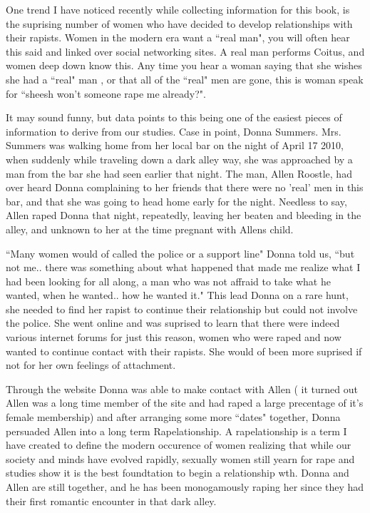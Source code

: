     One trend I have noticed recently while collecting information for this book, is the suprising number of women
who have decided to develop relationships with their rapists. Women in the modern era want a ``real man", you will often
hear this said and linked over social networking sites. A real man performs Coitus, and women deep down know this. Any time you
hear a woman saying that she wishes she had a ``real" man , or that all of the ``real" men are gone, this is woman speak
for ``sheesh won't someone rape me already?".


        It may sound funny, but data points to this being one of the easiest pieces of information to derive from our studies.
Case in point, Donna Summers. Mrs. Summers was walking home from her local bar on the night of April 17 2010, when suddenly
while traveling down a dark alley way, she was approached by a man from the bar she had seen earlier that night. The man, Allen
Roostle, had over heard Donna complaining to her friends that there were no 'real' men in this bar, and that she was going
to head home early for the night. Needless to say, Allen raped Donna that night, repeatedly, leaving her beaten and bleeding
in the alley, and unknown to her at the time pregnant with Allens child.


        ``Many women would of called the police or a support line" Donna told us, ``but not me.. there was something about
what happened that made me realize what I had been looking for all along, a man who was not affraid to take what he wanted,
when he wanted.. how he wanted it." This lead Donna on a rare hunt, she needed to find her rapist to continue their relationship
but could not involve the police. She went online and was suprised to learn that there were indeed various internet forums
for just this reason, women who were raped and now wanted to continue contact with their rapists. She would of been more suprised
if not for her own feelings of attachment.


        Through the website Donna was able to make contact with Allen ( it turned out Allen was a long time member of the site
and had raped a large precentage of it's female membership) and after arranging some more ``dates" together, Donna persuaded Allen
into a long term Rapelationship. A rapelationship is a term I have created to define the modern occurence of women realizing
that while our society and minds have evolved rapidly, sexually women still yearn for rape and studies show it is the
best foundtation to begin a relationship wth. Donna and Allen are still together, and he has been monogamously raping her
since they had their first romantic encounter in that dark alley.


